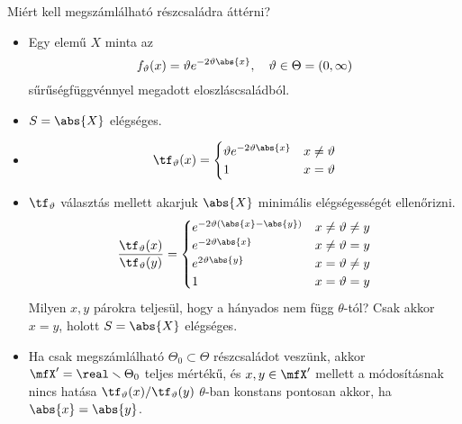 \documentclass[aspectratio=169,notheorems,9pt,\option]{beamer}
\begin{document}
\begin{frame}{Miért kell megszámlálható részcsaládra áttérni?}
  \begin{itemize}
    \item Egy elemű $X$ minta  az 
    \begin{displaymath}
      f_\theta(x) = \theta e^{-2\theta \abs{x}} ,\quad\theta\in\Theta=(0,\infty)
    \end{displaymath}
    sűrűségfüggvénnyel megadott eloszláscsaládból.
    \item $S=\abs{X}$ elégséges.
    \item 
    \begin{displaymath}
      \tf_\theta(x)=\begin{cases}
        \theta e^{-2\theta \abs{x}}& x\neq \theta\\
        1& x=\theta
      \end{cases}  
    \end{displaymath}
    \item $\tf_\theta$ választás mellett akarjuk $\abs{X}$ minimális elégségességét ellenőrizni.
    \begin{displaymath}
      \frac{\tf_\theta(x)}{\tf_\theta(y)}=\begin{cases}
        e^{-2\theta(\abs{x}-\abs{y})} & x\neq\theta\neq y\\
        e^{-2\theta\abs{x}} & x\neq\theta=y\\
        e^{2\theta\abs{y}} &x=\theta\neq y\\
        1 & x=\theta=y
      \end{cases}
    \end{displaymath}
    Milyen $x,y$ párokra teljesül, hogy a hányados nem függ $\theta$-tól?
    Csak akkor $x=y$, holott $S=\abs{X}$ elégséges.
    \item Ha csak megszámlálható $\Theta_0\subset \Theta$ részcsaládot veszünk, akkor 
    $\mfX'=\real\setminus\Theta_0$ teljes mértékű, és $x,y\in\mfX'$ mellett a módosításnak nincs hatása
    $\tf_\theta(x)/\tf_\theta(y)$ $\theta$-ban konstans pontosan akkor, ha $\abs{x}=\abs{y}$.
  \end{itemize}
  
\end{frame}
\end{document}
